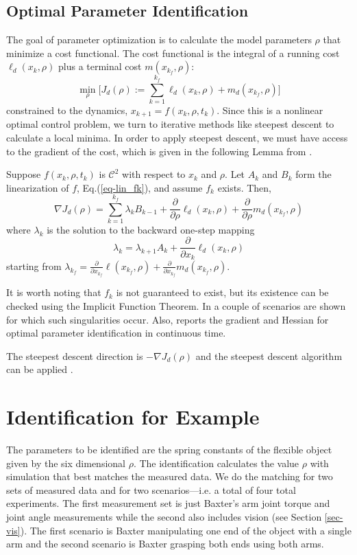 \documentclass[runningheads,a4paper]{llncs}
\begin{document}
\subsection{Optimal Parameter Identification \label{sec-opt}}
The goal of parameter optimization is to calculate the model parameters $\rho$ that minimize a cost functional.  The cost functional is the integral of a running cost $\ell_d(x_k,\rho)$ plus a terminal cost $m(x_{k_f},\rho)$:
\[
\min_{\rho} \Big[J_d(\rho):=\sum_{k=1}^{k_f}\ell_d(x_k,\rho) + m_d(x_{k_f},\rho)\Big]
\]
constrained to the dynamics, $x_{k+1} = f(x_k,\rho,t_k)$. Since this is a nonlinear optimal control problem, we turn to iterative methods like steepest descent to calculate a local minima. In order to apply steepest descent, we must have access to the gradient of the cost, which is given in the following Lemma from \cite{caldwell_coleman_correll_iros}. 
\begin{lemma}
\label{lem-grad_a}
Suppose $f(x_k,\rho,t_k)$ is $\mathcal{C}^2$ with respect to $x_k$ and $\rho$.  Let $A_k$ and $B_k$ form the linearization of $f$, Eq.(\ref{eq-lin_fk}), and assume $f_k$ exists.  Then,
\begin{equation}
\nabla J_d(\rho) = \sum_{k = 1}^{k_f}\lambda_kB_{k-1} +\frac{\partial}{\partial \rho}\ell_d(x_k,\rho) + \frac{\partial}{\partial \rho}m_d(x_{k_f},\rho)
\label{eq-DJa}
\end{equation}
where $\lambda_k$ is the solution to the backward one-step mapping
\begin{equation}
\lambda_k = \lambda_{k+1}A_{k} + \frac{\partial}{\partial x_{k}}\ell_d(x_{k},\rho) 
\label{eq-lambda}
\end{equation}
starting from $\lambda_{k_f} = \frac{\partial}{\partial x_{k_f}}\ell(x_{k_f},\rho) + \frac{\partial}{\partial x_{k_f}}m_d(x_{k_f},\rho)$.  
\end{lemma}

It is worth noting that $f_k$ is not guaranteed to exist, but its existence can be checked using the Implicit Function Theorem. In \cite{johnson_schultz_murphey} a couple of scenarios are shown for which such singularities occur.  Also, \cite{miller_murphey} reports the gradient and Hessian for optimal parameter identification in continuous time.

The steepest descent direction is $-\nabla J_d(\rho)$ and the steepest descent algorithm can be applied \cite{kelley}.

\section{Identification for Example}
\label{sec-id_eg}
The parameters to be identified are the spring constants of the flexible object given by the six dimensional $\rho$.  The identification calculates the value $\rho$ with simulation that best matches the measured data. We do the matching for two sets of measured data and for two scenarios---i.e. a total of four total experiments.  The first measurement set is just Baxter's arm joint torque and joint angle measurements while the second also includes vision (see Section \ref{sec-vis}).  The first scenario is Baxter manipulating one end of the object with a single arm and the second scenario is Baxter grasping both ends using both arms.
\end{document}

